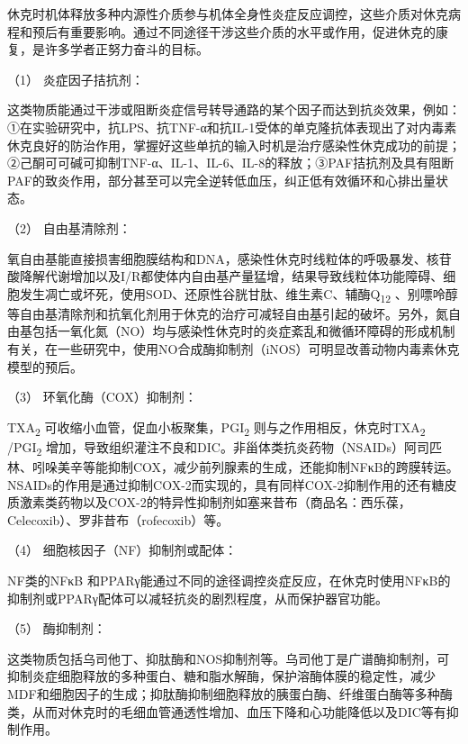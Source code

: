 休克时机体释放多种内源性介质参与机体全身性炎症反应调控，这些介质对休克病程和预后有重要影响。通过不同途径干涉这些介质的水平或作用，促进休克的康复，是许多学者正努力奋斗的目标。

\hypertarget{text00055.htmlux5cux23CHP2-1-3-3-2-1}{}
（1） 炎症因子拮抗剂：

这类物质能通过干涉或阻断炎症信号转导通路的某个因子而达到抗炎效果，例如：①在实验研究中，抗LPS、抗TNF-α和抗IL-1受体的单克隆抗体表现出了对内毒素休克良好的防治作用，掌握好这些单抗的输入时机是治疗感染性休克成功的前提；②己酮可可碱可抑制TNF-α、IL-1、IL-6、IL-8的释放；③PAF拮抗剂及具有阻断PAF的致炎作用，部分甚至可以完全逆转低血压，纠正低有效循环和心排出量状态。

\hypertarget{text00055.htmlux5cux23CHP2-1-3-3-2-2}{}
（2） 自由基清除剂：

氧自由基能直接损害细胞膜结构和DNA，感染性休克时线粒体的呼吸暴发、核苷酸降解代谢增加以及I/R都使体内自由基产量猛增，结果导致线粒体功能障碍、细胞发生凋亡或坏死，使用SOD、还原性谷胱甘肽、维生素C、辅酶Q\textsubscript{12}
、别嘌呤醇等自由基清除剂和抗氧化剂用于休克的治疗可减轻自由基引起的破坏。另外，氮自由基包括一氧化氮（NO）均与感染性休克时的炎症紊乱和微循环障碍的形成机制有关，在一些研究中，使用NO合成酶抑制剂（iNOS）可明显改善动物内毒素休克模型的预后。

\hypertarget{text00055.htmlux5cux23CHP2-1-3-3-2-3}{}
（3） 环氧化酶（COX）抑制剂：

TXA\textsubscript{2} 可收缩小血管，促血小板聚集，PGI\textsubscript{2}
则与之作用相反，休克时TXA\textsubscript{2} /PGI\textsubscript{2}
增加，导致组织灌注不良和DIC。非甾体类抗炎药物（NSAIDs）阿司匹林、吲哚美辛等能抑制COX，减少前列腺素的生成，还能抑制NFκB的跨膜转运。NSAIDs的作用是通过抑制COX-2而实现的，具有同样COX-2抑制作用的还有糖皮质激素类药物以及COX-2的特异性抑制剂如塞来昔布（商品名：西乐葆，Celecoxib）、罗非昔布（rofecoxib）等。

\hypertarget{text00055.htmlux5cux23CHP2-1-3-3-2-4}{}
（4） 细胞核因子（NF）抑制剂或配体：

NF类的NFκB
和PPARγ能通过不同的途径调控炎症反应，在休克时使用NFκB的抑制剂或PPARγ配体可以减轻抗炎的剧烈程度，从而保护器官功能。

\hypertarget{text00055.htmlux5cux23CHP2-1-3-3-2-5}{}
（5） 酶抑制剂：

这类物质包括乌司他丁、抑肽酶和NOS抑制剂等。乌司他丁是广谱酶抑制剂，可抑制炎症细胞释放的多种蛋白、糖和脂水解酶，保护溶酶体膜的稳定性，减少MDF和细胞因子的生成；抑肽酶抑制细胞释放的胰蛋白酶、纤维蛋白酶等多种酶类，从而对休克时的毛细血管通透性增加、血压下降和心功能降低以及DIC等有抑制作用。


